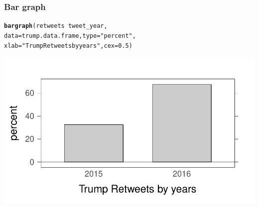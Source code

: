 \documentclass{beamer}\usepackage[]{graphicx}\usepackage[]{color}
\makeatletter
\newcommand{\hlnum}[1]{\textcolor[rgb]{0.2,0.2,0.2}{#1}}%
\newcommand{\hlstr}[1]{\textcolor[rgb]{0.2,0.2,0.2}{#1}}%
\newcommand{\hlopt}[1]{\textcolor[rgb]{0.102,0.102,0.102}{#1}}%
\newcommand{\hlstd}[1]{\textcolor[rgb]{0.102,0.102,0.102}{#1}}%
\newcommand{\hlkwc}[1]{\textcolor[rgb]{0.2,0.2,0.2}{#1}}%
\newcommand{\hlkwd}[1]{\textcolor[rgb]{0.102,0.102,0.102}{\textbf{#1}}}%
\newenvironment{kframe}{%
 \def\at@end@of@kframe{}%
 \ifinner\ifhmode%
  \def\at@end@of@kframe{\end{minipage}}%
  \begin{minipage}{\columnwidth}%
 \fi\fi%
 \def\FrameCommand##1{\hskip\@totalleftmargin \hskip-\fboxsep
 \colorbox{shadecolor}{##1}\hskip-\fboxsep
     \hskip-\linewidth \hskip-\@totalleftmargin \hskip\columnwidth}%
 \MakeFramed {\advance\hsize-\width
   \@totalleftmargin\z@ \linewidth\hsize
   \@setminipage}}%
 {\par\unskip\endMakeFramed%
 \at@end@of@kframe}
\newenvironment{knitrout}{}{} %
\renewenvironment{knitrout}{\begin{spacing}{0.75}\begin{tiny}}{\end{tiny}\end{spacing}}
\makeatother
\begin{document}
\begin{frame}[fragile]
\frametitle{Bar graph}

\begin{knitrout}\small
{}\color{fgcolor}\begin{kframe}
\begin{alltt}
\hlkwd{bargraph}\hlstd{(retweets} \hlopt{~} \hlstd{tweet_year,}
         \hlkwc{data}\hlstd{=trump.data.frame,} \hlkwc{type}\hlstd{=}\hlstr{"percent"}\hlstd{,}
          \hlkwc{xlab}\hlstd{=}\hlstr{"Trump Retweets by years"}\hlstd{,} \hlkwc{cex}\hlstd{=}\hlnum{0.5}\hlstd{)}
\end{alltt}
\end{kframe}

{\centering \includegraphics[width=0.99\linewidth]{figure/graphics-bar_retweets_2-1} 

}



\end{knitrout}

\end{frame}
\end{document}

